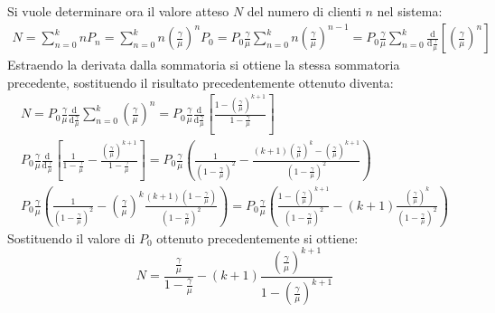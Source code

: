 \documentclass{article}
\newcommand{\df}{\mathrm{d}}
\numberwithin{equation}{subsection}
\begin{document}
Si vuole determinare ora il valore atteso $N$ del numero di clienti $n$ nel sistema:
\begin{gather*}
    N=\displaystyle\sum_{n=0}^knP_n=\sum_{n=0}^kn\left(\frac{\gamma}{\mu}\right)^nP_0=P_0\frac{\gamma}{\mu}\sum_{n=0}^kn\left(\frac{\gamma}{\mu}\right)^{n-1}=P_0\frac{\gamma}{\mu}\sum_{n=0}^k\frac{\df}{\df\displaystyle\frac{\gamma}{\mu}}\left[\left(\frac{\gamma}{\mu}\right)^n\right]
\end{gather*}
Estraendo la derivata dalla sommatoria si ottiene la stessa sommatoria precedente, sostituendo il risultato precedentemente ottenuto diventa: 
\begin{gather*}
    N=P_0\displaystyle\frac{\gamma}{\mu}\frac{\df}{\displaystyle \df\frac{\gamma}{\mu}}\sum_{n=0}^k\left(\frac{\gamma}{\mu}\right)^n=P_0\frac{\gamma}{\mu}\frac{\df}{\displaystyle \df\frac{\gamma}{\mu}}\left[\frac{1-\displaystyle\left(\frac{\gamma}{\mu}\right)^{k+1}}{1-\displaystyle\frac{\gamma}{\mu}}\right]\\
    \displaystyle P_0\frac{\gamma}{\mu}\frac{\df}{\displaystyle \df\frac{\gamma}{\mu}}\left[\frac{1}{1-\displaystyle\frac{\gamma}{\mu}}-\frac{\displaystyle\left(\frac{\gamma}{\mu}\right)^{k+1}}{1-\displaystyle\frac{\gamma}{\mu}}\right]=P_0\frac{\gamma}{\mu}\left(\frac{1}{\displaystyle\left(1-\frac{\gamma}{\mu}\right)^2}-\frac{(k+1)\displaystyle\left(\frac{\gamma}{\mu}\right)^k-\left(\frac{\gamma}{\mu}\right)^{k+1}}{\displaystyle\left(1-\frac{\gamma}{\mu}\right)^2}\right)\\
    P_0\frac{\gamma}{\mu}\left(\frac{1}{\displaystyle\left(1-\frac{\gamma}{\mu}\right)^2}-\left(\frac{\gamma}{\mu}\right)^k\frac{(k+1)\left(1-\displaystyle\frac{\gamma}{\mu}\right)}{\displaystyle\left(1-\frac{\gamma}{\mu}\right)^2}\right)=P_0\frac{\gamma}{\mu}\left(\frac{1-\displaystyle\left(\frac{\gamma}{\mu}\right)^{k+1}}{\displaystyle\left(1-\frac{\gamma}{\mu}\right)^2}-(k+1)\frac{\displaystyle\left(\frac{\gamma}{\mu}\right)^k}{\displaystyle\left(1-\frac{\gamma}{\mu}\right)^2}\right)
\end{gather*}
Sostituendo il valore di $P_0$ ottenuto precedentemente si ottiene: 
\begin{equation}
    N=\displaystyle\frac{\displaystyle\frac{\gamma}{\mu}}{1-\displaystyle\frac{\gamma}{\mu}}-(k+1)\frac{\displaystyle\left(\frac{\gamma}{\mu}\right)^{k+1}}{1-\left(\displaystyle\frac{\gamma}{\mu}\right)^{k+1}}
\end{equation}
\end{document}
